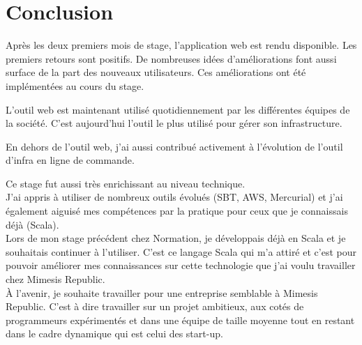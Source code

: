 \chapter{Conclusion}

Après les deux premiers mois de stage, l'application web est rendu disponible.
Les premiers retours sont positifs. De nombreuses idées d'améliorations font
aussi surface de la part des nouveaux utilisateurs.
Ces améliorations ont été implémentées au cours du stage.

L'outil web est maintenant utilisé quotidiennement par les différentes équipes
de la société. C'est aujourd'hui l'outil le plus utilisé pour gérer son
infrastructure.

En dehors de l'outil web, j'ai aussi contribué activement à l'évolution de l'outil
d'infra en ligne de commande.

Ce stage fut aussi très enrichissant au niveau technique.\\
J'ai appris à utiliser de nombreux outils évolués (SBT, AWS, Mercurial)
et j'ai également aiguisé mes compétences par la pratique pour ceux que je
connaissais déjà (Scala).\\

Lors de mon stage précédent chez Normation, je développais déjà en Scala et je
souhaitais continuer à l'utiliser. C'est ce langage Scala qui m'a attiré et
c'est pour pouvoir améliorer mes connaissances sur cette technologie que j'ai
voulu travailler chez Mimesis Republic.\\

À l'avenir, je souhaite travailler pour une entreprise semblable à Mimesis
Republic. C'est à dire travailler sur un projet ambitieux, aux cotés de
programmeurs expérimentés et dans une équipe de taille moyenne tout en restant
dans le cadre dynamique qui est celui des start-up.



